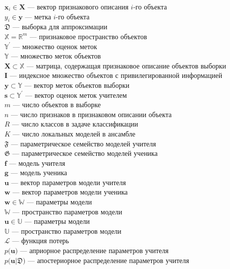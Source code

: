 \noindent
$\textbf{x}_i \in \textbf{X}$ --- вектор признакового описания $i$-го объекта\\
$y_i \in \mathbf{y}$ --- метка $i$-го объекта\\
$\mathfrak{D}$ --- выборка для аппроксимации\\
$\mathbb{X} = \mathbb{R}^m$ --- признаковое пространство объектов\\
$\mathbb{Y}^{'}$ --- множество оценок меток\\
$\mathbb{Y}$ --- множество меток объектов\\
$\textbf{X} \subset \mathbb{X}$ --- матрица, содержащая признаковое описание объектов выборки\\
$\mathbf{I}$ --- индексное множество объектов с привилегированной информацией\\
$\textbf{y} \subset \mathbb{Y}$ --- вектор меток объектов выборки\\
$\mathbf{s} \subset \mathbb{Y}^{'}$ --- вектор оценок меток учителем\\
$m$ --- число объектов в выборке\\
$n$ --- число признаков в признаковом описании объекта\\
$R$ --- число классов в задаче классификации\\
$K$ --- число локальных моделей в ансамбле\\
$\mathfrak{F}$ --- параметрическое семейство моделей учителя\\
$\mathfrak{G}$ --- параметрическое семейство моделей ученика\\
$\mathbf{f}$ --- модель учителя\\
$\mathbf{g}$ --- модель ученика\\
$\mathbf{u}$ --- вектор параметров модели учителя\\
$\mathbf{w}$ --- вектор параметров модели ученика\\
$\textbf{w} \in \mathbb{W}$ --- параметры модели\\
$\mathbb{W}$ --- пространство параметров модели\\
$\textbf{u} \in \mathbb{U}$ --- параметры модели\\
$\mathbb{U}$ --- пространство параметров модели\\
$\mathcal{L}$ --- функция потерь\\
$p\bigr(\mathbf{u}\bigr)$ --- априорное распределение параметров учителя\\
$p\bigr(\mathbf{u}|\mathfrak{D}\bigr)$ --- апостериорное распределение параметров учителя\\
